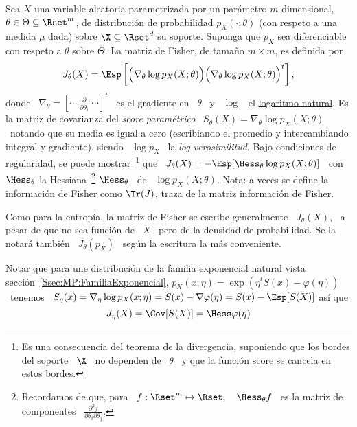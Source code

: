 \begin{definicion}
\label{Def:SZ:MatrizFisherParametrica}
%
  Sea   $X$   una   variable   aleatoria  parametrizada   por   un   par\'ametro
  $m$-dimensional, $\theta  \in \Theta \subseteq \Rset^m$,  de distribuci\'on de
  probabilidad $p_X(\cdot;\theta)$  (con respeto a una medida  $\mu$ dada) sobre
  $\X \subseteq  \Rset^d$ su  soporte. Suponga que  $p_X$ sea  diferenciable con
  respeto a $\theta$ sobre $\Theta$.  La matriz de Fisher, de tama\~no $m \times
  m$, es definida por
  \[
  J_\theta(X)  =  \Esp\left[  \Big(  \nabla_\theta \log  p_X(X;\theta)  \Big)
    \Big( \nabla_\theta \log p_X(X;\theta) \Big)^t \right],
  \]
  donde \  $\nabla_\theta = \left[ \cdots  \: \frac{\partial}{\partial \theta_i}
    \: \cdots  \right]^t$ \  es el gradiente  en \  $\theta$ \ y  \ $\log$  \ el
  \underline{logaritmo  natural}.  Es  la matriz  de covarianza  del  {\it score
    param\'etrico} \ $S_\theta(X) = \nabla_\theta  \log p_X(X;\theta)$ \ notando que su
  media es  igual a  cero (escribiando el  promedio y intercambiando  integral y
  gradiente),  siendo   \  $\log  p_X$  \  la   {\it  log-verosimilitud}.   Bajo
  condiciones de regularidad, se puede mostrar~\footnote{Es una consecuencia del
    teorema de la divergencia, suponiendo que los bordes del soporte \ $\X$ \ no
    dependen  de \  $\theta$ \  y que  la funci\'on  score se  cancela  en estos
    bordes.}  que  \ $J_\theta(X) =  - \Esp[\Hess_\theta \log  p_X(X;\theta)]$ \
  con $\Hess_\theta$ la Hessiana~\footnote{Recordamos de que, para \ $f: \Rset^m
    \mapsto  \Rset,  \quad \Hess_\theta  f$  \ es  la  matriz  de componentes  \
    $\frac{\partial^2 f}{\partial \theta_i \partial \theta_j}$.}  $\Hess_\theta$
  \ de  \ $\log  p_X(X;\theta)$.  Nota:  a veces se  define la  informaci\'on de
  Fisher como $\Tr(J)$, traza de la matriz informaci\'on de Fisher.
\end{definicion}
%
Como  para  la  entrop\'ia,  la  matriz  de Fisher  se  escribe  generalmente  \
$J_\theta(X)$, \ a pesar de que no sea  funci\'on de \ $X$ \ pero de la densidad
de  probabilidad.  Se  la  notar\'a  tambi\'en \  $J_\theta(p_X)$  \ seg\'un  la
escritura la m\'as conveniente.

Notar  que para  une  distribuci\'on  de la  familia  exponencial natural  vista
secci\'on~\ref{Ssec:MP:FamiliaExponencial},  $p_X(x;\eta)  =  \exp\left(  \eta^t
  S(x)  - \varphi(\eta)  \right)$  \  tenemos \  $S_\eta(x)  = \nabla_\eta  \log
p_X(x;\eta) = S(x) - \nabla \varphi(\eta) = S(x) - \Esp[S(X)]$ as\'i que
%
\[
J_\eta(X) = \Cov[S(X)] = \Hess \varphi(\eta)
\]

